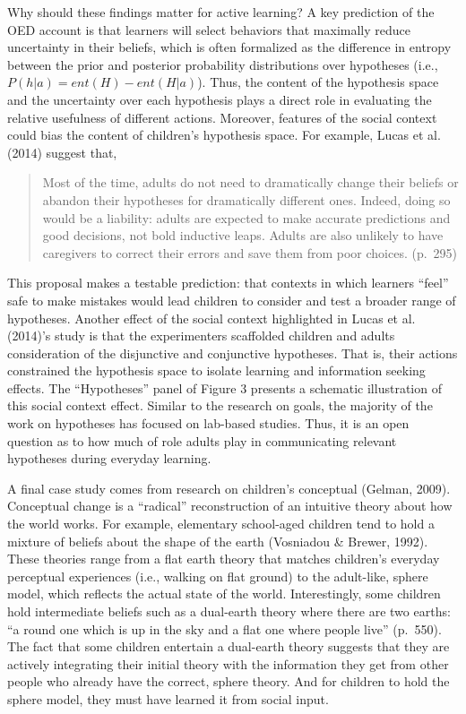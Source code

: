 \documentclass[english,floatsintext,man]{apa6}
\theoremstyle{definition}
\theoremstyle{definition}
\theoremstyle{definition}
\theoremstyle{remark}
\begin{document}
Why should these findings matter for active learning? A key prediction
of the OED account is that learners will select behaviors that maximally
reduce uncertainty in their beliefs, which is often formalized as the
difference in entropy between the prior and posterior probability
distributions over hypotheses (i.e., \(P(h|a) = ent(H) - ent(H|a)\)).
Thus, the content of the hypothesis space and the uncertainty over each
hypothesis plays a direct role in evaluating the relative usefulness of
different actions. Moreover, features of the social context could bias
the content of children's hypothesis space. For example, Lucas et al.
(2014) suggest that,

\begin{quote}
Most of the time, adults do not need to dramatically change their
beliefs or abandon their hypotheses for dramatically different ones.
Indeed, doing so would be a liability: adults are expected to make
accurate predictions and good decisions, not bold inductive leaps.
Adults are also unlikely to have caregivers to correct their errors and
save them from poor choices. (p.~295)
\end{quote}

\noindent
This proposal makes a testable prediction: that contexts in which
learners \enquote{feel} safe to make mistakes would lead children to
consider and test a broader range of hypotheses. Another effect of the
social context highlighted in Lucas et al. (2014)'s study is that the
experimenters scaffolded children and adults consideration of the
disjunctive and conjunctive hypotheses. That is, their actions
constrained the hypothesis space to isolate learning and information
seeking effects. The \enquote{Hypotheses} panel of Figure 3 presents a
schematic illustration of this social context effect. Similar to the
research on goals, the majority of the work on hypotheses has focused on
lab-based studies. Thus, it is an open question as to how much of role
adults play in communicating relevant hypotheses during everyday
learning.

A final case study comes from research on children's conceptual (Gelman,
2009). Conceptual change is a \enquote{radical} reconstruction of an
intuitive theory about how the world works. For example, elementary
school-aged children tend to hold a mixture of beliefs about the shape
of the earth (Vosniadou \& Brewer, 1992). These theories range from a
flat earth theory that matches children's everyday perceptual
experiences (i.e., walking on flat ground) to the adult-like, sphere
model, which reflects the actual state of the world. Interestingly, some
children hold intermediate beliefs such as a dual-earth theory where
there are two earths: \enquote{a round one which is up in the sky and a
flat one where people live} (p.~550). The fact that some children
entertain a dual-earth theory suggests that they are actively
integrating their initial theory with the information they get from
other people who already have the correct, sphere theory. And for
children to hold the sphere model, they must have learned it from social
input.
\end{document}
